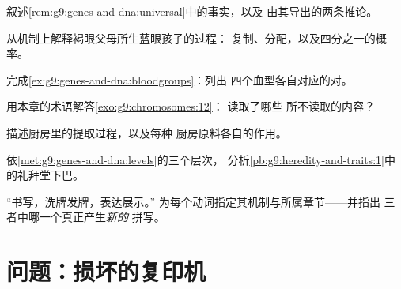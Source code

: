 \begin{exercise}[$\star$]\label{exo:g9:genes-and-dna:6}
叙述\cref{rem:g9:genes-and-dna:universal}中的事实，以及
由其导出的两条推论。
\end{exercise}

\begin{exercise}[$\star\star$]\label{exo:g9:genes-and-dna:7}
从机制上解释褐眼父母所生蓝眼孩子的过程：
复制、分配，以及四分之一的概率。
\end{exercise}

\begin{exercise}[$\star\star$]\label{exo:g9:genes-and-dna:8}
完成\cref{ex:g9:genes-and-dna:bloodgroups}：列出
四个血型各自对应的对。
\end{exercise}

\begin{exercise}[$\star\star$]\label{exo:g9:genes-and-dna:9}
用本章的术语解答\cref{exo:g9:chromosomes:12}：
读取了哪些
所不读取的内容？
\end{exercise}

\begin{exercise}[$\star\star$]\label{exo:g9:genes-and-dna:10}
描述厨房里的提取过程，以及每种
厨房原料各自的作用。
\end{exercise}

\begin{exercise}[$\star\star$]\label{exo:g9:genes-and-dna:11}
依\cref{met:g9:genes-and-dna:levels}的三个层次，
分析\cref{pb:g9:heredity-and-traits:1}中的礼拜堂下巴。
\end{exercise}

\begin{exercise}[$\star\star\star$]\label{exo:g9:genes-and-dna:12}
“书写，洗牌发牌，表达展示。”
为每个动词指定其机制与所属章节——并指出
三者中哪一个真正产生\emph{新的}
拼写。
\end{exercise}

\section{问题：损坏的复印机}

